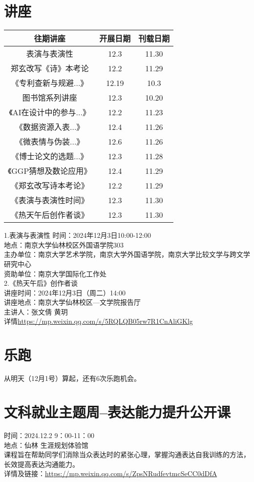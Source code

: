 \documentclass[letterpaper, 12pt]{article}
\begin{document}
\begin{multicols}{2}

\section{讲座}
\begin{tabular}{|c|c|c|}
    \hline
    往期讲座 & 开展日期 & 刊载日期\\
    \hline\hline
    表演与表演性 & 12.3 & 11.30\\
    郑玄改写《诗》本考论 & 12.2 & 11.29\\
    《专利查新与规避...》 & 12.19 & 10.3\\
    图书馆系列讲座 & 12.3 & 10.20\\
    《AI在设计中的参与...》 & 12.2 & 11.23\\
    《数据资源入表...》 & 12.4 & 11.26\\
    《微表情与伪装...》 & 12.6 & 11.26\\
    《博士论文的选题...》 & 12.3 & 11.28\\
    《GGP猜想及数论应用》 & 12.4 & 11.29\\
    《郑玄改写诗本考论》 & 12.2 & 11.29\\
    《表演与表演性时间》 & 12.3 & 11.30\\
    《热天午后创作者谈》 & 12.3 & 11.30\\
    \hline
\end{tabular}

1.表演与表演性
时间：2024年12月3日10:00-12:00\\
地点：南京大学仙林校区外国语学院303\\
主办单位：南京大学艺术学院，南京大学外国语学院，南京大学比较文学与跨文学研究中心\\
资助单位：南京大学国际化工作处\\
2.《热天午后》创作者谈\\
讲座时间：2024年12月3日（周二）14:00\\
讲座地点：南京大学仙林校区—文学院报告厅\\
主讲人：张文倩  黄玥\\
详情\url{https://mp.weixin.qq.com/s/5RQLQB05rw7R1CnAliGKlg}\\


\section{乐跑}
从明天（12月1号）算起，还有6次乐跑机会。

\section{文科就业主题周--表达能力提升公开课}
时间：2024.12.2 9：00-11：00\\
地点：仙林 生涯规划体验馆\\
课程旨在帮助同学们消除当众表达时的紧张心理，掌握沟通表达自我训练的方法，长效提高表达沟通能力。\\
详情及链接：\url{https://mp.weixin.qq.com/s/ZpsNRudfevtmcSeCC0dDfA}\\

\end{multicols}
\end{document}
